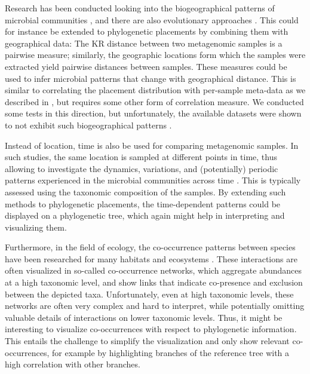 Research has been conducted looking into the biogeographical patterns of microbial communities
\cite{HughesMartiny2006}, and there are also evolutionary approaches \cite{Cox2016}.
This could for instance be extended to phylogenetic placements by combining them with geographical data:
The KR distance between two metagenomic samples is a pairwise measure;
similarly, the geographic locations form which the samples were extracted yield pairwise distances between samples.
These measures could be used to infer microbial patterns that change with geographical distance.
This is similar to correlating the placement distribution with per-sample meta-data
as we described in ,
but requires some other form of correlation measure.
We conducted some tests in this direction, but unfortunately,
the available datasets were shown to not exhibit such biogeographical patterns \cite{Lentendu2018}.

Instead of location, time is also be used for comparing metagenomic samples.
In such studies, the same location is sampled at different points in time,
thus allowing to investigate the dynamics, variations, and (potentially) periodic patterns
experienced in the microbial communities across time \cite{Costello2009,Faust2015}.
This is typically assessed using the taxonomic composition of the samples.
By extending such methods to phylogenetic placements,
the time-dependent patterns could be displayed on a phylogenetic tree,
which again might help in interpreting and visualizing them.

Furthermore, in the field of ecology, the co-occurrence patterns between species
have been researched for many habitats and ecosystems \cite{Lima-Mendez2015,Villalobos2017,Zelezniak2015}.
These interactions are often visualized in so-called co-occurrence networks,
which aggregate abundances at a high taxonomic level,
and show links that indicate co-presence and exclusion between the depicted taxa.
Unfortunately, even at high taxonomic levels, these networks are often very complex and hard to interpret,
while potentially omitting valuable details of interactions on lower taxonomic levels.
Thus, it might be interesting to visualize co-occurrences with respect to phylogenetic information.
This entails the challenge to simplify the visualization and only show relevant co-occurrences,
for example by highlighting branches of the reference tree with a high correlation with other branches.

